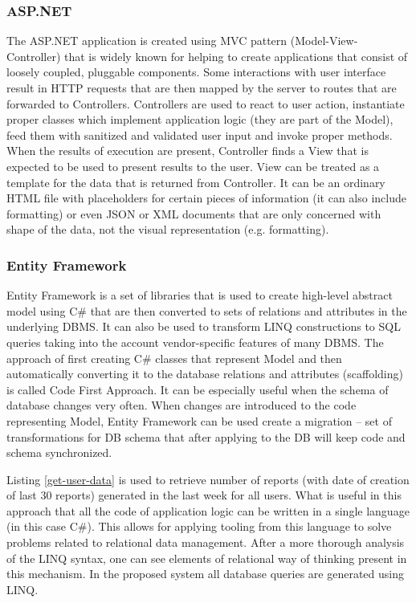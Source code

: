 \documentclass[12pt, twoside, openany]{report}
\theoremstyle{definition}
\begin{document}
\subsubsection{ASP.NET}
The ASP.NET application is created using MVC pattern (Model-View-Controller) that is widely known for helping to create applications that consist of loosely coupled, pluggable components. Some interactions with user interface result in HTTP requests that are then mapped by the server to routes that are forwarded to Controllers. Controllers are used to react to user action, instantiate proper classes which implement application logic (they are part of the Model), feed them with sanitized and validated user input and invoke proper methods. When the results of execution are present, Controller finds a View that is expected to be used to present results to the user. View can be treated as a template for the data that is returned from Controller. It can be an ordinary HTML file with placeholders for certain pieces of information (it can also include formatting) or even JSON or XML documents that are only concerned with shape of the data, not the visual representation (e.g. formatting).

\subsubsection{Entity Framework}
Entity Framework is a set of libraries that is used to create high-level abstract model using C\# that are then converted to sets of relations and attributes in the underlying DBMS. It can also be used to transform LINQ constructions to SQL queries taking into the account vendor-specific features of many DBMS.
The approach of first creating C\# classes that represent Model and then automatically converting it to the database relations and attributes (scaffolding) is called Code First Approach. It can be especially useful when the schema of database changes very often. When changes are introduced to the code representing Model, Entity Framework can be used create a migration -- set of transformations for DB schema that after applying to the DB will keep code and schema synchronized. 

Listing \ref{get-user-data} is used to retrieve number of reports (with date of creation of last 30 reports) generated in the last week for all users. What is useful in this approach that all the code of application logic can be written in a single language (in this case C\#). This allows for applying tooling from this language to solve problems related to relational data management. After a more thorough analysis of the LINQ syntax, one can see elements of relational way of thinking present in this mechanism. In the proposed system all database queries are generated using LINQ.
\end{document}
